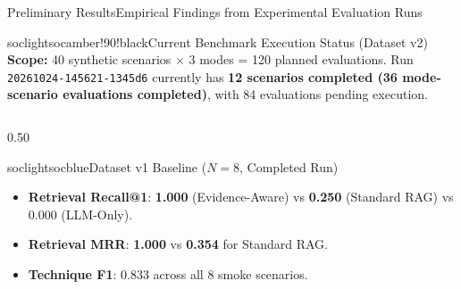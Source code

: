 \documentclass[aspectratio=169, 10pt]{beamer}
\begin{document}
\begin{frame}{Preliminary Results}{Empirical Findings from Experimental Evaluation Runs}
  \begin{cardbox}{soclight}{socamber!90!black}{Current Benchmark Execution Status (Dataset v2)}
    \scriptsize\textbf{Scope:} 40 synthetic scenarios $\times$ 3 modes = 120 planned evaluations. Run \texttt{20261024-145621-1345d6} currently has \textbf{12 scenarios completed (36 mode-scenario evaluations completed)}, with 84 evaluations pending execution.
  \end{cardbox}

  \vspace{0.08cm}
  \centering

  \vspace{0.10cm}
  \begin{columns}[T]
    \begin{column}{0.50\textwidth}
      \begin{cardbox}{soclight}{socblue}{Dataset v1 Baseline ($N=8$, Completed Run)}
        \begin{itemize}\setlength{\itemsep}{1pt}
          \item \textbf{Retrieval Recall@1}: \textbf{1.000} (Evidence-Aware) vs \textbf{0.250} (Standard RAG) vs 0.000 (LLM-Only).
          \item \textbf{Retrieval MRR}: \textbf{1.000} vs \textbf{0.354} for Standard RAG.
          \item \textbf{Technique F1}: 0.833 across all 8 smoke scenarios.
        \end{itemize}
      \end{cardbox}
    \end{column}


\end{columns}
\end{frame}
\end{document}
